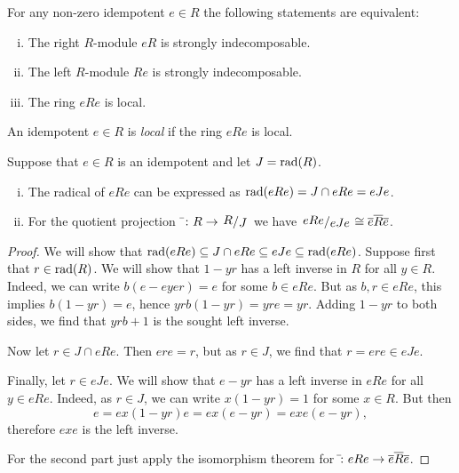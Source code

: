 \begin{posledica}
For any non-zero idempotent $e \in R$ the following statements are
equivalent:

\begin{enumerate}[i)]
\item The right $R$-module $eR$ is strongly indecomposable.
\item The left $R$-module $Re$ is strongly indecomposable.
\item The ring $eRe$ is local.
\end{enumerate}
\end{posledica}

\obvs

\begin{definicija}
An idempotent $e \in R$ is \emph{local} if
the ring $eRe$ is local.
\end{definicija}

\begin{izrek}
Suppose that $e \in R$ is an idempotent and let $J = \operatorname{rad}(R)$.

\begin{enumerate}[i)]
\item The radical of $eRe$ can be expressed as
$\operatorname{rad}(eRe) = J \cap eRe = eJe$.
\item For the quotient projection
$\bar{~} \colon R \to \kvoc{R}{J}$ we have
$\kvoc{eRe}{eJe} \cong \oline{e} \oline{R} \oline{e}$.
\end{enumerate}
\end{izrek}

\begin{proof}
We will show that
$\operatorname{rad}(eRe) \subseteq J \cap eRe \subseteq eJe \subseteq \operatorname{rad}(eRe)$.
Suppose first that $r \in \operatorname{rad}(R)$. We will show that $1 - yr$ has
a left inverse in $R$ for all $y \in R$. Indeed, we can write
$b(e - eye r) = e$ for some $b \in eRe$. But as $b, r \in eRe$,
this implies $b(1 - yr) = e$, hence $yrb(1-yr) = yre = yr$. Adding
$1-yr$ to both sides, we find that $yrb + 1$ is the sought left
inverse.

Now let $r \in J \cap eRe$. Then $ere = r$, but as $r \in J$, we
find that $r = ere \in eJe$.

Finally, let $r \in eJe$. We will show that $e - yr$ has a left
inverse in $eRe$ for all $y \in eRe$. Indeed, as $r \in J$, we can
write $x (1 - yr) = 1$ for some $x \in R$. But then
\[
e = ex (1 - yr) e = ex (e - yr) = exe (e - yr),
\]
therefore $exe$ is the left inverse.

For the second part just apply the isomorphism theorem for
$\bar{} \colon eRe \to \overline{e} \overline{R} \overline{e}$.
\end{proof}

